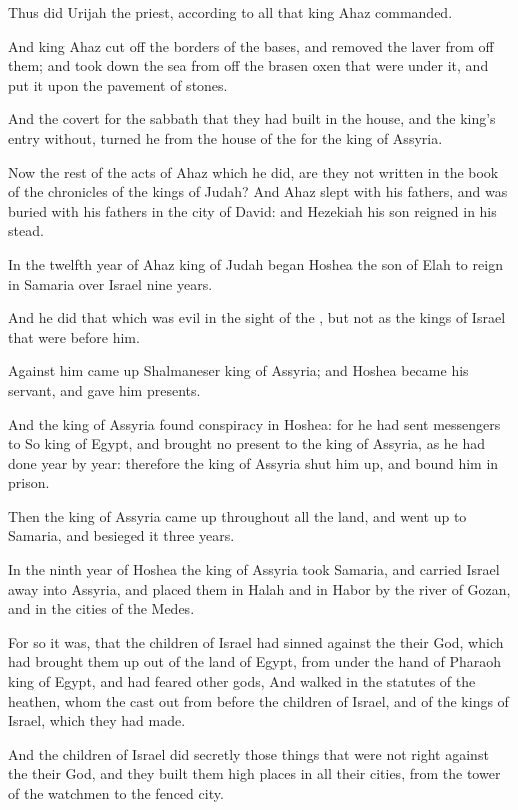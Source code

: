 \Verse Thus did Urijah the priest, according to all that king Ahaz commanded.

\Verse And king Ahaz cut off the borders of the bases, and removed the laver from off them; and took down the sea from off the brasen oxen that were under it, and put it upon the pavement of stones.

\Verse And the covert for the sabbath that they had built in the house, and the king's entry without, turned he from the house of the \LORD for the king of Assyria.

\Verse Now the rest of the acts of Ahaz which he did, are they not written in the book of the chronicles of the kings of Judah?  \Verse And Ahaz slept with his fathers, and was buried with his fathers in the city of David: and Hezekiah his son reigned in his stead.


\Chapter
\Verse In the twelfth year of Ahaz king of Judah began Hoshea the son of Elah to reign in Samaria over Israel nine years.

\Verse And he did that which was evil in the sight of the \LORD, but not as the kings of Israel that were before him.

\Verse Against him came up Shalmaneser king of Assyria; and Hoshea became his servant, and gave him presents.

\Verse And the king of Assyria found conspiracy in Hoshea: for he had sent messengers to So king of Egypt, and brought no present to the king of Assyria, as he had done year by year: therefore the king of Assyria shut him up, and bound him in prison.

\Verse Then the king of Assyria came up throughout all the land, and went up to Samaria, and besieged it three years.

\Verse In the ninth year of Hoshea the king of Assyria took Samaria, and carried Israel away into Assyria, and placed them in Halah and in Habor by the river of Gozan, and in the cities of the Medes.

\Verse For so it was, that the children of Israel had sinned against the \LORD their God, which had brought them up out of the land of Egypt, from under the hand of Pharaoh king of Egypt, and had feared other gods, \Verse And walked in the statutes of the heathen, whom the \LORD cast out from before the children of Israel, and of the kings of Israel, which they had made.

\Verse And the children of Israel did secretly those things that were not right against the \LORD their God, and they built them high places in all their cities, from the tower of the watchmen to the fenced city.

